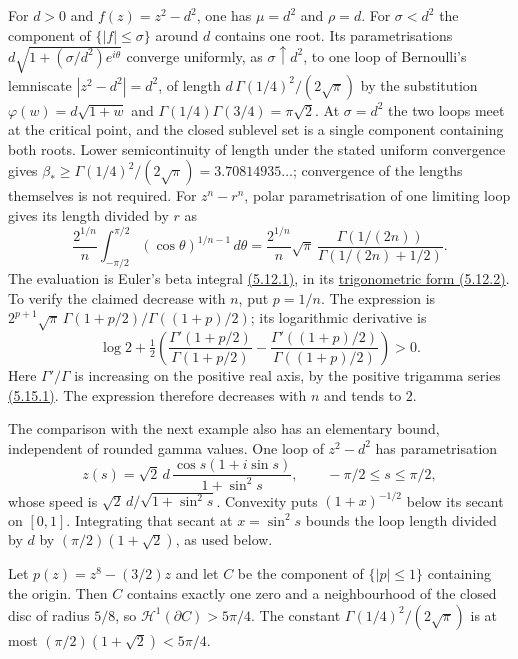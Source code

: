 For $d>0$ and $f(z)=z^2-d^2$, one has $\mu=d^2$ and $\rho=d$.  For $\sigma<d^2$ the component
of $\{|f|\le\sigma\}$ around $d$ contains one root. Its parametrisations
$d\sqrt{1+(\sigma/d^2)e^{i\theta}}$ converge uniformly, as $\sigma\uparrow d^2$,
to one loop of Bernoulli's lemniscate $|z^2-d^2|=d^2$, of length $d\,\Gamma(1/4)^2/(2\sqrt\pi)$ by the substitution
$\varphi(w)=d\sqrt{1+w}$ and $\Gamma(1/4)\Gamma(3/4)=\pi\sqrt2$.  At
$\sigma=d^2$ the two loops meet at the critical point, and the closed sublevel
set is a single component containing both roots. Lower semicontinuity
of length under the stated uniform convergence gives
$\beta_*\ge\Gamma(1/4)^2/(2\sqrt\pi)=3.70814935\ldots$;
convergence of the lengths themselves is not required.
For $z^n-r^n$, polar parametrisation of one limiting loop gives its
length divided by $r$ as
\[
 \frac{2^{1/n}}{n}\int_{-\pi/2}^{\pi/2}
     (\cos\theta)^{1/n-1}\,d\theta
 =\frac{2^{1/n}}{n}\sqrt\pi\,
     \frac{\Gamma(1/(2n))}{\Gamma(1/(2n)+1/2)}.
\]
The evaluation is Euler's beta integral
\href{https://dlmf.nist.gov/5.12.E1}{(5.12.1)}, in its
\href{https://dlmf.nist.gov/5.12.E2}{trigonometric form (5.12.2)}.
To verify the claimed decrease with $n$, put $p=1/n$. The expression is
$2^{p+1}\sqrt\pi\,\Gamma(1+p/2)/\Gamma((1+p)/2)$; its logarithmic
derivative is
\[
 \log2+\tfrac12\left(
    \frac{\Gamma'(1+p/2)}{\Gamma(1+p/2)}-
    \frac{\Gamma'((1+p)/2)}{\Gamma((1+p)/2)}\right)>0.
\]
Here $\Gamma'/\Gamma$ is increasing on the positive real axis, by the
positive trigamma series \href{https://dlmf.nist.gov/5.15.E1}{(5.15.1)}.
The expression therefore decreases with $n$ and tends to $2$.

The comparison with the next example also has an elementary bound,
independent of rounded gamma values. One loop of $z^2-d^2$ has
parametrisation
\[
 z(s)=\sqrt2\,d\,
   \frac{\cos s(1+i\sin s)}{1+\sin^2s},
 \qquad -\pi/2\le s\le\pi/2,
\]
whose speed is $\sqrt2\,d/\sqrt{1+\sin^2s}$. Convexity puts
$(1+x)^{-1/2}$ below its secant on $[0,1]$. Integrating that secant
at $x=\sin^2s$ bounds the loop length divided by $d$ by
$(\pi/2)(1+\sqrt2)$, as used below.

\begin{proposition}
\label{res:one-root-gamma-false}
Let $p(z)=z^8-(3/2)z$ and let $C$ be the component of $\{|p|\le1\}$
containing the origin.  Then $C$ contains exactly one zero and a
neighbourhood of the closed disc of radius $5/8$, so
$\mathcal H^1(\partial C)>5\pi/4$.  The constant
$\Gamma(1/4)^2/(2\sqrt{\pi})$ is at most $(\pi/2)(1+\sqrt2)<5\pi/4$.
\end{proposition}

